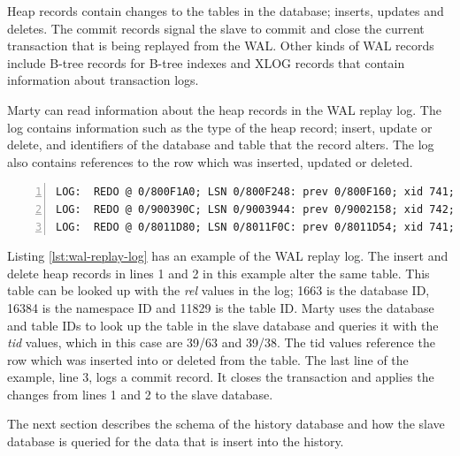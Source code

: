 Heap records contain changes to the tables in the database; inserts, updates and deletes.
The commit records signal the slave to commit and close the current transaction that is being replayed from the WAL.
Other kinds of WAL records include B-tree records for B-tree indexes and XLOG records that contain information about transaction logs.

Marty can read information about the heap records in the WAL replay log.
The log contains information such as the type of the heap record; insert, update or delete, and identifiers of the database and table that the record alters.
The log also contains references to the row which was inserted, updated or deleted.

\begin{lstlisting}[caption={WAL replay log example},label={lst:wal-replay-log},numbers=left,xleftmargin=2em]
LOG:  REDO @ 0/800F1A0; LSN 0/800F248: prev 0/800F160; xid 741; len 139: Heap - insert: rel 1663/16384/11829; tid 39/63
LOG:  REDO @ 0/900390C; LSN 0/9003944: prev 0/9002158; xid 742; len 26: Heap - delete: rel 1663/16384/11829; tid 39/38 KEYS_UPDATED
LOG:  REDO @ 0/8011D80; LSN 0/8011F0C: prev 0/8011D54; xid 741; len 368: Transaction - commit: 2014-03-06 23:36:33.937958+00
\end{lstlisting}

Listing \ref{lst:wal-replay-log} has an example of the WAL replay log.
The insert and delete heap records in lines 1 and 2 in this example alter the same table.
This table can be looked up with the \textit{rel} values in the log; 1663 is the database ID, 16384 is the namespace ID and 11829 is the table ID.
Marty uses the database and table IDs to look up the table in the slave database and queries it with the \textit{tid} values, which in this case are 39/63 and 39/38.
The tid values reference the row which was inserted into or deleted from the table.
The last line of the example, line 3, logs a commit record.
It closes the transaction and applies the changes from lines 1 and 2 to the slave database.

The next section describes the schema of the history database and how the slave database is queried for the data that is insert into the history.